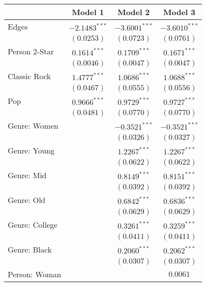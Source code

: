 
\begin{table}
\begin{center}
\begin{tabular}{l c c c}
\toprule
 & Model 1 & Model 2 & Model 3 \\
\midrule
Edges           & $-2.1483^{***}$ & $-3.6001^{***}$ & $-3.6010^{***}$ \\
                & $(0.0253)$      & $(0.0723)$      & $(0.0761)$      \\
Person 2-Star   & $0.1614^{***}$  & $0.1709^{***}$  & $0.1671^{***}$  \\
                & $(0.0046)$      & $(0.0047)$      & $(0.0047)$      \\
Classic Rock    & $1.4777^{***}$  & $1.0686^{***}$  & $1.0688^{***}$  \\
                & $(0.0467)$      & $(0.0555)$      & $(0.0556)$      \\
Pop             & $0.9666^{***}$  & $0.9729^{***}$  & $0.9727^{***}$  \\
                & $(0.0481)$      & $(0.0770)$      & $(0.0770)$      \\
Genre: Women    &                 & $-0.3521^{***}$ & $-0.3521^{***}$ \\
                &                 & $(0.0326)$      & $(0.0327)$      \\
Genre: Young    &                 & $1.2267^{***}$  & $1.2267^{***}$  \\
                &                 & $(0.0622)$      & $(0.0622)$      \\
Genre: Mid      &                 & $0.8149^{***}$  & $0.8151^{***}$  \\
                &                 & $(0.0392)$      & $(0.0392)$      \\
Genre: Old      &                 & $0.6842^{***}$  & $0.6836^{***}$  \\
                &                 & $(0.0629)$      & $(0.0629)$      \\
Genre: College  &                 & $0.3261^{***}$  & $0.3259^{***}$  \\
                &                 & $(0.0411)$      & $(0.0411)$      \\
Genre: Black    &                 & $0.2060^{***}$  & $0.2062^{***}$  \\
                &                 & $(0.0307)$      & $(0.0307)$      \\
Person: Woman   &                 &                 & $0.0061$        \\

\end{tabular}
\end{center}
\end{table}
